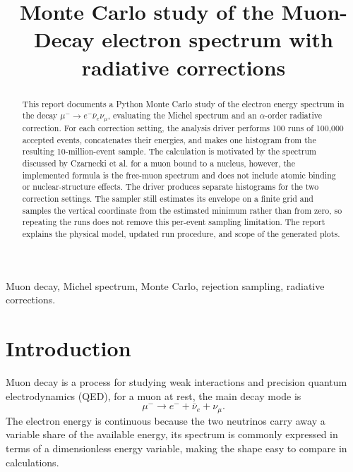 \documentclass[conference]{IEEEtran}
\begin{document}
\title{Monte Carlo study of the Muon-Decay electron spectrum with radiative corrections}

\author{
}

\maketitle

\begin{abstract}
This report documents a Python Monte Carlo study of the electron energy spectrum in the decay $\mu^-\to e^-\bar{\nu}_e\nu_\mu$, evaluating the Michel spectrum and an $\alpha$-order radiative correction. For each correction setting, the analysis driver performs 100 runs of 100,000 accepted events, concatenates their energies, and makes one histogram from the resulting 10-million-event sample. The calculation is motivated by the spectrum discussed by Czarnecki et al. for a muon bound to a nucleus, however, the implemented formula is the free-muon spectrum and does not include atomic binding or nuclear-structure effects. The driver produces separate histograms for the two correction settings. The sampler still estimates its envelope on a finite grid and samples the vertical coordinate from the estimated minimum rather than from zero, so repeating the runs does not remove this per-event sampling limitation. The report explains the physical model, updated run procedure, and scope of the generated plots.
\end{abstract}

\begin{IEEEkeywords}
Muon decay, Michel spectrum, Monte Carlo, rejection sampling, radiative corrections.
\end{IEEEkeywords}

\section{Introduction}

Muon decay is a process for studying weak interactions and precision quantum electrodynamics (QED), for a muon at rest, the main decay mode is
\begin{equation}
    \mu^- \longrightarrow e^- + \bar{\nu}_e + \nu_\mu.
\end{equation}
The electron energy is continuous because the two neutrinos carry away a variable share of the available energy, its spectrum is commonly expressed in terms of a dimensionless energy variable, making the shape easy to compare in calculations.
\end{document}
